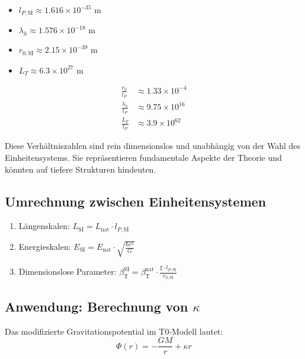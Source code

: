 \documentclass[12pt,a4paper]{article}
\newcommand{\betaT}{\beta_{\text{T}}}
\begin{document}
	\begin{itemize}
		\item \(l_{P,\text{SI}} \approx 1.616 \times 10^{-35} \text{ m}\)
		\item \(\lambda_h \approx 1.576 \times 10^{-18} \text{ m}\)
		\item \(r_{0,\text{SI}} \approx 2.15 \times 10^{-39} \text{ m}\)
		\item \(L_T \approx 6.3 \times 10^{27} \text{ m}\)
	\end{itemize}
	\begin{align}
		\frac{r_0}{l_P} &\approx 1.33 \times 10^{-4} \\
		\frac{\lambda_h}{l_P} &\approx 9.75 \times 10^{16} \\
		\frac{L_T}{l_P} &\approx 3.9 \times 10^{62}
	\end{align}
	
	Diese Verhältniszahlen sind rein dimensionslos und unabhängig von der Wahl des Einheitensystems. Sie repräsentieren fundamentale Aspekte der Theorie und könnten auf tiefere Strukturen hindeuten.
	
	\subsection{Umrechnung zwischen Einheitensystemen}
	
	\begin{tcolorbox}[colback=blue!5!white, colframe=blue!75!black, title=Umrechnungsschema]
		\begin{enumerate}
			\item Längenskalen: \(L_{\text{SI}} = L_{\text{nat}} \cdot l_{P,\text{SI}}\)
			\item Energieskalen: \(E_{\text{SI}} = E_{\text{nat}} \cdot \sqrt{\frac{\hbar c^5}{G}}\)
			\item Dimensionslose Parameter: \(\betaT^{\text{SI}} = \betaT^{\text{nat}} \cdot \frac{\xi \cdot l_{P,\text{SI}}}{r_{0,\text{SI}}}\)
		\end{enumerate}
	\end{tcolorbox}
	
	\subsection{Anwendung: Berechnung von \(\kappa\)}
	
	Das modifizierte Gravitationspotential im T0-Modell lautet:
	\begin{equation}
		\Phi(r) = -\frac{G M}{r} + \kappa r
	\end{equation}
	
\end{document}
